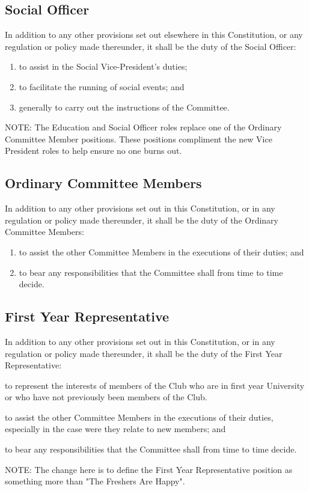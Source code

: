 \documentclass[11pt]{article} %
\begin{document}
{\color{ForestGreen} \subsection{Social Officer}
In addition to any other provisions set out elsewhere in this Constitution, or any regulation or policy made thereunder, it shall be the duty of the Social Officer:
\begin{enumerate}
	\item to assist in the Social Vice-President's duties;
	\item to facilitate the running of social events; and
	\item generally to carry out the instructions of the Committee.
\end{enumerate}}

{\color{Cyan}NOTE:
The Education and Social Officer roles replace one of the Ordinary Committee Member positions.
These positions compliment the new Vice President roles to help ensure no one burns out.
}

\subsection{Ordinary Committee Members}
In addition to any other provisions set out in this Constitution, or in any regulation or policy made thereunder, it shall be the duty of the Ordinary Committee Members:
\begin{enumerate}
	\item to assist the other Committee Members in the executions of their duties; and
	\item to bear any responsibilities that the Committee shall from time to time decide.
\end{enumerate}

\subsection{First Year Representative}
In addition to any other provisions set out in this Constitution, or in any regulation or policy made thereunder, it shall be the duty of the First Year Representative:
\begin{enumerate}
	\item to represent the interests of members of the Club who are in first year University or who have not previously been members of the Club.
	{\color{ForestGreen}\item to assist the other Committee Members in the executions of their duties, especially in the case were they relate to new members; and
	\item to bear any responsibilities that the Committee shall from time to time decide.}
\end{enumerate}
{\color{Cyan}NOTE:
The change here is to define the First Year Representative position as something more than "The Freshers Are Happy".
}
\end{document}
